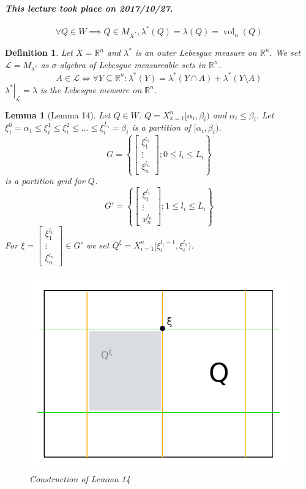 \documentclass{article}
\newtheorem{definition}{Definition}  \numberwithin{definition}{section}
\newtheorem{lemma}{Lemma}  \numberwithin{lemma}{section}
\newcommand{\set}[1]{\left\{#1\right\}}
\newcommand{\dateref}[1]{\paragraph{\textit{This lecture took place on #1.}}}
\begin{document}
\dateref{2017/10/27}

\[ \forall Q \in W \implies Q \in M_{X^*}, \lambda^*(Q) = \lambda(Q) = \operatorname{vol}_n(Q) \]

\begin{definition}
  Let $X = \mathbb R^n$ and $\lambda^*$ is an outer Lebesgue measure on $\mathbb R^n$.
  We set $\mathcal L = M_{\lambda^*}$ as $\sigma$-algebra of Lebesgue measureable sets in $\mathbb R^n$.
  \[ A \in \mathcal L \Leftrightarrow \forall Y \subseteq \mathbb R^n: \lambda^*(Y) = \lambda^*(Y \cap A) + \lambda^*(Y \setminus A) \]
  $\left.\lambda^*\right|_{\mathcal L} = \lambda$ is the Lebesgue measure on $\mathbb R^n$.
\end{definition}

\begin{lemma}[Lemma 14]
  Let $Q \in W$. $Q = X_{x=1}^n [\alpha_i, \beta_i)$ and $\alpha_i \leq \beta_i$.
  Let $\xi_1^0 = \alpha_1 \leq \xi_i^1 \leq \xi_i^2 \leq \ldots \leq \xi_i^{L_i} = \beta_i$ is a partition of $[\alpha_i, \beta_i)$.
  \[ G = \set{\begin{bmatrix} \xi_1^{l_1} \\ \vdots \\ \xi_n^{l_n} \end{bmatrix}; 0 \leq l_i \leq L_i} \]
  is a partition grid for $Q$.
  \[ G' = \set{\begin{bmatrix} \xi_1^{l_1} \\ \vdots \\ x_n^{l_n} \end{bmatrix}; 1 \leq l_i \leq L_i} \]
  For $\xi = \begin{bmatrix} \xi_1^{l_1} \\ \vdots \\ \xi_n^{l_n} \end{bmatrix} \in G'$ we set $Q^\xi = X_{i=1}^n [\xi_i^{l_1 - 1}, \xi_i^{l_1})$.

  \begin{figure}[t]
    \begin{center}
      \includegraphics{img/09_lebesgue.pdf}
      \caption{Construction of Lemma 14}
    \end{center}
  \end{figure}


\end{lemma}
\end{document}
